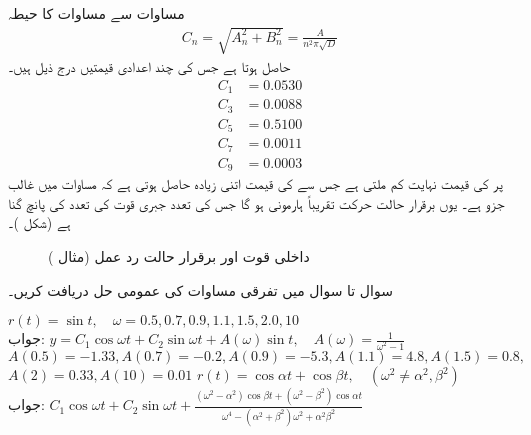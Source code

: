 مساوات  سے مساوات   کا حیطہ
\begin{align*}
C_n=\sqrt{A_n^2+B_n^2}=\frac{A}{n^2\pi\sqrt{D}}
\end{align*}
حاصل ہوتا ہے  جس کی چند اعدادی قیمتیں درج ذیل ہیں۔
\begin{align*}
C_1&=0.0530\\
C_3&=0.0088\\
C_5&=0.5100\\
C_7&=0.0011\\
C_9&=0.0003
\end{align*}
 پر  کی قیمت نہایت کم ملتی ہے  جس سے  کی قیمت اتنی زیادہ حاصل ہوتی ہے کہ مساوات  میں  غالب جزو  ہے۔ یوں برقرار حالت حرکت تقریباً ہارمونی ہو گا جس کی تعدد جبری قوت کی تعدد کی پانچ گنا ہے (شکل )۔
\begin{figure}
\centering
{}
\caption{داخلی قوت اور برقرار حالت رد عمل (مثال )}
\label{شکل_مثال_فوریئر_جبری_ارتعاش_رد_عمل}
\end{figure}

سوال  تا سوال  میں تفرقی مساوات  کی عمومی حل دریافت کریں۔

\quad 
$r(t)=\sin t,\quad \omega =0.5,0.7,0.9,1.1,1.5,2.0,10$\\
جواب:\quad
$y=C_1\cos \omega t+C_2\sin \omega t+A(\omega)\sin t,\quad A(\omega)=\tfrac{1}{\omega^2-1}$\\
$A(0.5)=-1.33,A(0.7)=-0.2, A(0.9)=-5.3,A(1.1)=4.8,A(1.5)=0.8,$\\
 $A(2)=0.33, A(10)=0.01$
\quad 
$r(t)=\cos \alpha t+\cos \beta t, \quad (\omega^2 \ne \alpha^2,\beta^2)$\\
جواب:\quad
$C_1\cos \omega t+C_2\sin \omega t+\tfrac{(\omega^2-\alpha^2)\cos \beta t+(\omega^2-\beta^2)\cos \alpha t}{\omega^4-(\alpha^2+\beta^2)\omega^2+\alpha^2\beta^2}$
